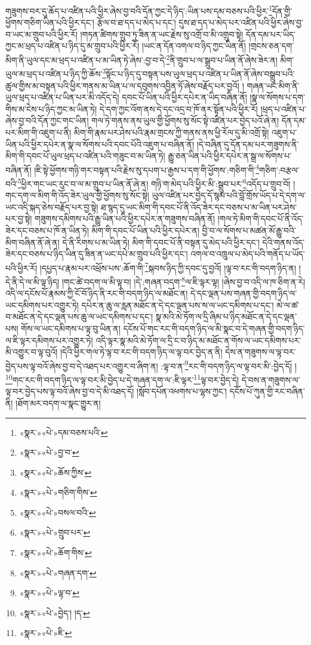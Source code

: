 གཟུགས་བར་དུ་ཆོད་པ་འཛིན་པའི་ཕྱིར་ཞེས་བྱ་བའི་དོན་ཀྱང་དེ་ཉིད་:ཡིན་པས་དམ་བཅས་པའི་ཕྱིར་\footnote{«སྣར་»«པེ་»དམ་བཅས་པའི་}དོན་གྱི་ཕྱོགས་གཅིག་ཡིན་པའི་ཕྱིར་དང་། རྩོལ་བ་ཐ་དད་པ་མེད་པ་དང་། དུས་ཐ་དད་པ་མེད་པར་འཛིན་པའི་ཕྱིར་ཞེས་བྱ་བ་ཡང་མ་གྲུབ་པའི་ཕྱིར་རོ། །གཏན་ཚིགས་གྲུབ་ཏུ་ཟིན་ན་ཡང་རྗེས་སུ་འགྲོ་བ་མི་འགྲུབ་སྟེ། དོན་དམ་པར་ཡིད་ཀྱང་མ་ཕྲད་པ་འཛིན་པ་ཉིད་དུ་མ་གྲུབ་པའི་ཕྱིར་རོ། །ཡང་ན་དོན་འགལ་བ་ཉིད་ཀྱང་ཡིན་ནོ། །གྲངས་ཅན་དག་མིག་ནི་ཡུལ་དང་མ་ཕྲད་པ་འཛིན་པ་མ་ཡིན་ཏེ་ཞེས་:བྱ་བ་དེ་\footnote{«སྣར་»«པེ་»བྱ་བ་}ནི་གྲུབ་པ་ལ་སྒྲུབ་པ་ཡིན་ནོ་ཞེས་ཟེར་ན། མིག་ཡུལ་མ་ཕྲད་པ་འཛིན་པ་ཉིད་ཀྱི་ཆོས་\footnote{«སྣར་»«པེ་»ཆོས་ཀྱིས་}སྟོང་པ་ཉིད་དུ་བསྟན་པས་ཡུལ་ཕྲད་པ་འཛིན་པ་ཡིན་ནོ་ཞེས་བསྒྲུབ་པའི་ཚུལ་གྱིས་མ་བསྟན་པའི་ཕྱིར་གནས་མ་ཡིན་པ་ལ་དབུགས་འབྱིན་ཏོ་ཞེས་བརྗོད་པར་བྱའོ། །
གཞན་ཡང་མིག་ནི་ཡུལ་ཕྲད་པ་འཛིན་པ་ཡིན་པར་མི་འདོད་དེ། དབང་པོ་ཡིན་པའི་ཕྱིར་དཔེར་ན་ཡིད་བཞིན་ནོ། །སྣ་ལ་སོགས་པ་དག་གིས་མ་ངེས་པ་ཉིད་ཀྱང་མ་ཡིན་ཏེ། དེ་དག་ཀྱང་འོག་ནས་དེ་དང་འདྲ་བ་ཁོ་ནར་སྟོན་པའི་ཕྱིར་རོ། །ཕྲད་པ་འཛིན་པ་ཞེས་བྱ་བའི་དོན་ཀྱང་གང་ཡིན། གལ་ཏེ་གནས་ནས་ཡུལ་གྱི་ཕྱོགས་སུ་སོང་སྟེ་འཛིན་པར་བྱེད་པའོ་ཞེ་ན། དོན་དམ་པར་མིག་གི་འཇུག་པ་ནི། མིག་གི་རྣམ་པར་ཤེས་པའི་རྣམ་གྲངས་ཀྱི་གནས་ནས་ཕྱི་རོལ་དུ་མི་འགྲོ་སྟེ། འཇུག་པ་ཡིན་པའི་ཕྱིར་དཔེར་ན་སྣ་ལ་སོགས་པའི་དབང་པོའི་འཇུག་པ་བཞིན་ནོ། །དེ་བཞིན་དུ་དོན་དམ་པར་གཟུགས་ནི་མིག་གི་དབང་པོ་ཡུལ་ཕྲད་པ་འཛིན་པའི་གཟུང་བ་མ་ཡིན་ཏེ། རྒྱུ་ཅན་ཡིན་པའི་ཕྱིར་དཔེར་ན་སྒྲ་ལ་སོགས་པ་བཞིན་ནོ། །ཇི་སྟེ་ཕྱོགས་གཉི་གར་བསྟན་པའི་རྗེས་སུ་དཔག་པ་རྒྱས་པ་དག་གི་ཕྱོགས་:གཅིག་གི་\footnote{«སྣར་»«པེ་»གཅིག་གིས་}གཅིག་:བརྩལ་བའི་\footnote{«སྣར་»«པེ་»བསལ་བའི་}ཕྱིར་གང་ཡང་རུང་བ་ལ་མ་གྲུབ་པ་ཡིན་ནོ་ཞེ་ན། གཉི་ག་མེད་པའི་ཕྱིར་མི་:སྒྲུབ་པར་\footnote{«སྣར་»«པེ་»གྲུབ་པར་}འདོད་པ་གྲུབ་བོ། །གང་དག་ལ་མིག་གི་འོད་ཟེར་ཡུལ་གྱི་ཕྱོགས་སུ་སོང་སྟེ། ཡུལ་འཛིན་པར་བྱེད་དོ་སྙམ་པའི་བློ་གྲོས་ཡོད་པ་དེ་དག་ལ་ཡང་འདི་སྐད་ཅེས་བརྗོད་པར་བྱ་སྟེ། ཐ་སྙད་དུ་ཡང་མིག་གི་དབང་པོ་ནི་འོད་ཟེར་དང་བཅས་པ་མ་ཡིན་པར་ཤེས་པར་བྱ་སྟེ། གཟུགས་དམིགས་པའི་རྒྱུ་ཡིན་པའི་ཕྱིར་དཔེར་ན་གཟུགས་བཞིན་ནོ། །གལ་ཏེ་མིག་གི་དབང་པོ་ནི་འོད་ཟེར་དང་བཅས་པ་ཁོ་ན་ཡིན་ཏེ། མིག་གི་དབང་པོ་ཡིན་པའི་ཕྱིར་དཔེར་ན། བྱི་བ་ལ་སོགས་པ་མཚན་མོ་རྒྱུ་བའི་མིག་བཞིན་ནོ་ཞེ་ན། དེ་ནི་རིགས་པ་མ་ཡིན་ཏེ། མིག་གི་དབང་པོ་ནི་བསྟན་དུ་མེད་པའི་ཕྱིར་དང་། དེའི་གནས་འོད་ཟེར་དང་བཅས་པ་ཉིད་ཡིན་དུ་ཟིན་ན་ཡང་དཔེ་མ་གྲུབ་པའི་ཕྱིར་དང་། འགལ་བ་འཁྲུལ་པ་མེད་པའི་གནོད་པ་ཡོད་པའི་ཕྱིར་རོ། །དཔྱད་པ་རྣམ་པར་འཕྲོས་པས་:ཆོག་གི་\footnote{«སྣར་»«པེ་»ཆོག་གིས་}སྐབས་ཉིད་ཀྱི་དབང་དུ་བྱའོ། །ལྟ་བ་རང་གི་བདག་ཉིད་ན། །དེ་ནི་དེ་ལ་མི་ལྟ་ཉིད། །གང་ཚེ་བདག་ལ་མི་ལྟ་བ། །དེ་:གཞན་བདག་\footnote{«སྣར་»«པེ་»གཞན་དག་}ལ་ཇི་ལྟར་ལྟ། །ཞེས་བྱ་བ་འདི་ལ་ཁ་ཅིག་ན་རེ། འདི་ལ་དངོས་པོ་རྣམས་ཀྱི་ངོ་བོ་ཉིད་ནི་རང་གི་བདག་ཉིད་ལ་མཐོང་ན། དེ་དང་ལྡན་པས་གཞན་གྱི་བདག་ཉིད་ལ་ཡང་དམིགས་པར་འགྱུར་ཏེ། དཔེར་ན་ཆུ་ལ་རླན་མཐོང་ན་དེ་དང་ལྡན་པས་ས་ལ་ཡང་དམིགས་པ་དང་། མེ་ལ་ཚ་བ་མཐོང་ན་དེ་དང་ལྡན་པས་ཆུ་ལ་ཡང་དམིགས་པ་དང་། སྣ་མའི་མེ་ཏོག་ལ་དྲི་ཞིམ་པ་ཉིད་མཐོང་ན་དེ་དང་ལྡན་པས། གོས་ལ་ཡང་དམིགས་པ་ལྟ་བུ་ཡིན་ན། དངོས་པོ་གང་རང་གི་བདག་ཉིད་ལ་མི་སྣང་བ་དེ་གཞན་གྱི་བདག་ཉིད་ལ་ཇི་ལྟར་དམིགས་པར་འགྱུར་ཏེ། འདི་ལྟར་སྣ་མའི་མེ་ཏོག་ལ་དྲི་ང་བ་ཉིད་མ་མཐོང་ན་གོས་ལ་ཡང་དམིགས་པར་མི་འགྱུར་བ་ལྟ་བུའོ། །དེའི་ཕྱིར་གལ་ཏེ་ལྟ་བ་རང་གི་བདག་ཉིད་ལ་ལྟ་བར་བྱེད་ན་ནི། དེས་ན་གཟུགས་ལ་ལྟ་བར་བྱེད་པས་ལྟ་བའོ་ཞེས་བྱ་བ་དེ་འཐད་པར་འགྱུར་བ་ཞིག་ན། :ལྟ་བ་ན་\footnote{«སྣར་»«པེ་»ལྟ་བ་}རང་གི་བདག་ཉིད་ལ་ལྟ་བར་མི་:བྱེད་དོ། །\footnote{«སྣར་»«པེ་»བྱེད་། །ད་}གང་རང་གི་བདག་ཉིད་ལ་ལྟ་བར་མི་བྱེད་པ་དེ་གཞན་དག་ལ་:ཇི་ལྟར་\footnote{«སྣར་»«པེ་»ཇི་}ལྟ་བར་བྱེད་དེ། དེ་བས་ན་གཟུགས་ལ་ལྟ་བར་བྱེད་པས་ལྟ་བའོ་ཞེས་བྱ་བ་དེ་མི་འཐད་དོ། །སློབ་དཔོན་འཕགས་པ་ལྷས་ཀྱང་། དངོས་པོ་ཀུན་གྱི་རང་བཞིན་ནི། །ཐོག་མར་བདག་ལ་སྣང་གྱུར་ན། 